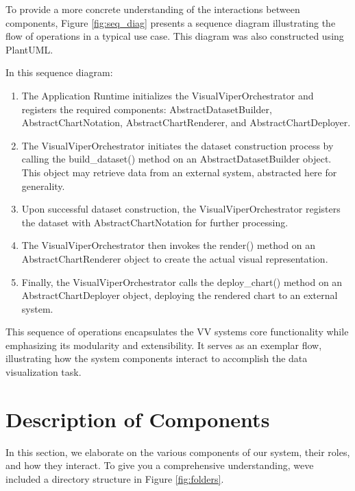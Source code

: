 To provide a more concrete understanding of the interactions between
components, Figure \ref{fig:seq_diag} presents a sequence diagram illustrating the flow
of operations in a typical use case. This diagram was also constructed
using PlantUML.

In this sequence diagram:

\begin{enumerate}
\def\labelenumi{\arabic{enumi}.}
\item
  The Application Runtime initializes the VisualViperOrchestrator and
  registers the required components: AbstractDatasetBuilder,
  AbstractChartNotation, AbstractChartRenderer, and
  AbstractChartDeployer.
\item
  The VisualViperOrchestrator initiates the dataset construction process
  by calling the build\_dataset() method on an AbstractDatasetBuilder
  object. This object may retrieve data from an external system,
  abstracted here for generality.
\item
  Upon successful dataset construction, the VisualViperOrchestrator
  registers the dataset with AbstractChartNotation for further
  processing.
\item
  The VisualViperOrchestrator then invokes the render() method on an
  AbstractChartRenderer object to create the actual visual
  representation.
\item
  Finally, the VisualViperOrchestrator calls the deploy\_chart() method
  on an AbstractChartDeployer object, deploying the rendered chart to an
  external system.
\end{enumerate}

This sequence of operations encapsulates the VV system\textquotesingle s
core functionality while emphasizing its modularity and extensibility.
It serves as an exemplar flow, illustrating how the system components
interact to accomplish the data visualization task.

\section{Description of Components}\label{description-of-components}

In this section, we elaborate on the various components of our system,
their roles, and how they interact. To give you a comprehensive
understanding, we\textquotesingle ve included a directory structure in
Figure \ref{fig:folders}.


